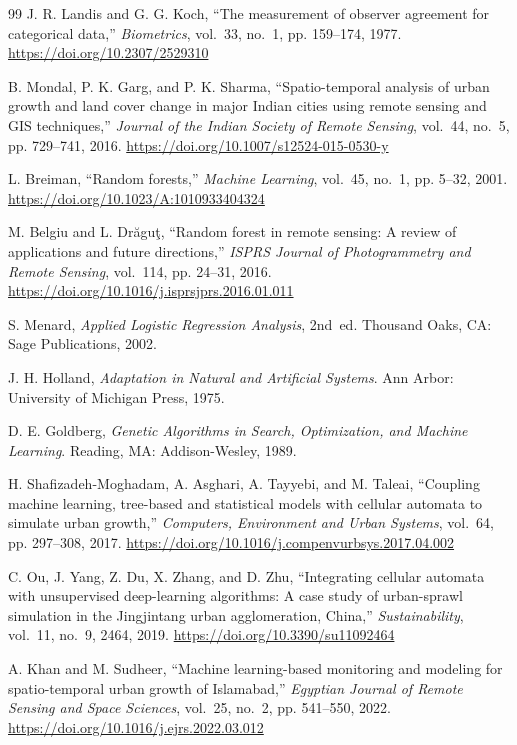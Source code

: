 \documentclass[12pt,a4paper]{article}
\begin{document}
\begin{thebibliography}{99}
J. R. Landis and G. G. Koch, ``The measurement of observer agreement for categorical data,'' \textit{Biometrics}, vol.~33, no.~1, pp. 159--174, 1977.
\url{https://doi.org/10.2307/2529310}

B. Mondal, P. K. Garg, and P. K. Sharma, ``Spatio-temporal analysis of urban growth and land cover change in major Indian cities using remote sensing and GIS techniques,'' \textit{Journal of the Indian Society of Remote Sensing}, vol.~44, no.~5, pp. 729--741, 2016.
\url{https://doi.org/10.1007/s12524-015-0530-y}

L. Breiman, ``Random forests,'' \textit{Machine Learning}, vol.~45, no.~1, pp. 5--32, 2001.
\url{https://doi.org/10.1023/A:1010933404324}

M. Belgiu and L. Dr\u{a}gu\c{t}, ``Random forest in remote sensing: A review of applications and future directions,'' \textit{ISPRS Journal of Photogrammetry and Remote Sensing}, vol.~114, pp. 24--31, 2016.
\url{https://doi.org/10.1016/j.isprsjprs.2016.01.011}

S. Menard, \textit{Applied Logistic Regression Analysis}, 2nd~ed. Thousand Oaks, CA: Sage Publications, 2002.

J. H. Holland, \textit{Adaptation in Natural and Artificial Systems}. Ann Arbor: University of Michigan Press, 1975.

D. E. Goldberg, \textit{Genetic Algorithms in Search, Optimization, and Machine Learning}. Reading, MA: Addison-Wesley, 1989.


H. Shafizadeh-Moghadam, A. Asghari, A. Tayyebi, and M. Taleai, ``Coupling machine learning, tree-based and statistical models with cellular automata to simulate urban growth,'' \textit{Computers, Environment and Urban Systems}, vol.~64, pp. 297--308, 2017.
\url{https://doi.org/10.1016/j.compenvurbsys.2017.04.002}

C. Ou, J. Yang, Z. Du, X. Zhang, and D. Zhu, ``Integrating cellular automata with unsupervised deep-learning algorithms: A case study of urban-sprawl simulation in the Jingjintang urban agglomeration, China,'' \textit{Sustainability}, vol.~11, no.~9, 2464, 2019.
\url{https://doi.org/10.3390/su11092464}

A. Khan and M. Sudheer, ``Machine learning-based monitoring and modeling for spatio-temporal urban growth of Islamabad,'' \textit{Egyptian Journal of Remote Sensing and Space Sciences}, vol.~25, no.~2, pp. 541--550, 2022.
\url{https://doi.org/10.1016/j.ejrs.2022.03.012}


\end{thebibliography}
\end{document}
